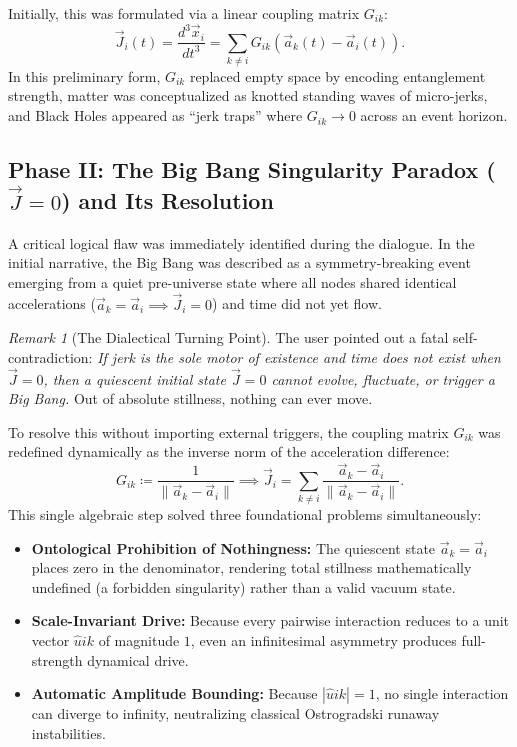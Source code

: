 \documentclass[11pt,a4paper]{article}
\theoremstyle{plain}
\theoremstyle{definition}
\theoremstyle{remark}
\newtheorem{remark}{Remark}[section]
\begin{document}
Initially, this was formulated via a linear coupling matrix $G_{ik}$:
\begin{equation}
    \vec{J}_i(t) = \frac{d^3 \vec{x}_i}{dt^3} = \sum_{k \neq i} G_{ik} \left( \vec{a}_k(t) - \vec{a}_i(t) \right).
    \label{eq:initial_jerk}
\end{equation}
In this preliminary form, $G_{ik}$ replaced empty space by encoding entanglement strength, matter was conceptualized as knotted standing waves of micro-jerks, and Black Holes appeared as ``jerk traps'' where $G_{ik} \to 0$ across an event horizon.

\subsection{Phase II: The Big Bang Singularity Paradox ($\vec{J} = 0$) and Its Resolution}

A critical logical flaw was immediately identified during the dialogue. In the initial narrative, the Big Bang was described as a symmetry-breaking event emerging from a quiet pre-universe state where all nodes shared identical accelerations ($\vec{a}_k = \vec{a}_i \implies \vec{J}_i = 0$) and time did not yet flow.

\begin{remark}[The Dialectical Turning Point]
The user pointed out a fatal self-contradiction: \textit{If jerk is the sole motor of existence and time does not exist when $\vec{J}=0$, then a quiescent initial state $\vec{J}=0$ cannot evolve, fluctuate, or trigger a Big Bang.} Out of absolute stillness, nothing can ever move.
\end{remark}

To resolve this without importing external triggers, the coupling matrix $G_{ik}$ was redefined dynamically as the inverse norm of the acceleration difference:
\begin{equation}
    G_{ik} \coloneqq \frac{1}{\|\vec{a}_k - \vec{a}_i\|} \implies \vec{J}_i = \sum_{k \neq i} \frac{\vec{a}_k - \vec{a}_i}{\|\vec{a}_k - \vec{a}_i\|}.
    \label{eq:normalized_jerk}
\end{equation}
This single algebraic step solved three foundational problems simultaneously:
\begin{itemize}
    \item \textbf{Ontological Prohibition of Nothingness:} The quiescent state $\vec{a}_k = \vec{a}_i$ places zero in the denominator, rendering total stillness mathematically undefined (a forbidden singularity) rather than a valid vacuum state.
\item \textbf{Scale-Invariant Drive:} Because every pairwise interaction reduces to a unit vector $\hat{u}{ik}$ of magnitude $1$, even an infinitesimal asymmetry produces full-strength dynamical drive.
\item \textbf{Automatic Amplitude Bounding:} Because $|\hat{u}{ik}| = 1$, no single interaction can diverge to infinity, neutralizing classical Ostrogradski runaway instabilities.
\end{itemize}
\end{document}
